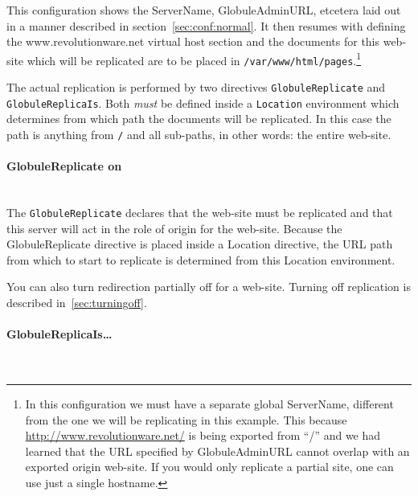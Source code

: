 \documentclass[10pt,a4paper]{article}
\makeatletter
\newenvironment{p}{\@open{P}{}}{\@close{P}}
\newenvironment{p}{}{\par}
\makeatother
\begin{document}
\begin{p}
This configuration shows the ServerName, GlobuleAdminURL, etcetera laid out in
a manner described in section~\ref{sec:conf:normal}.  It then resumes with
defining the www.revolutionware.net virtual host section and the documents for
this web-site which will be replicated are to be placed in
\verb!/var/www/html/pages!.\footnote{In this configuration we must have a
separate global ServerName, different from the one we will be replicating in
this example.  This because \url{http://www.revolutionware.net/} is being
exported from ``/'' and we had learned that the URL specified by
GlobuleAdminURL cannot overlap with an exported origin web-site.  If you would
only replicate a partial site, one can use just a single hostname.}
\end{p}

\begin{p}
The actual replication is performed by two directives
\texttt{GlobuleReplicate} and \texttt{GlobuleReplicaIs}.  Both \emph{must} be
defined inside a \texttt{Location} environment which determines from which
path the documents will be replicated.  In this case the path is anything from
\verb!/! and all sub-paths, in other words: the entire web-site.
\end{p}

\paragraph*{GlobuleReplicate on}~\\

\begin{p}
The \texttt{GlobuleReplicate} declares that the web-site must be replicated
and that this server will act in the role of origin for the
web-site.  Because the GlobuleReplicate directive is placed inside a Location
directive, the URL path from which to start to replicate is determined from
this Location environment.
\end{p}

\begin{p}
You can also turn redirection partially off for a web-site.  Turning off
replication is described in~\ref{sec:turningoff}.
\end{p}

\paragraph*{GlobuleReplicaIs\ldots}~\\
\end{document}
